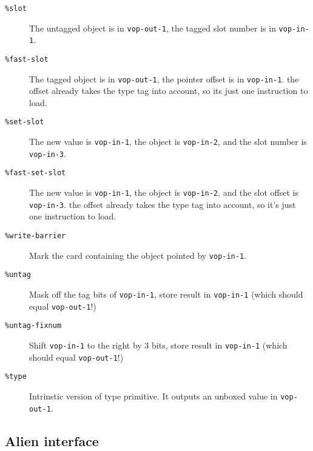 \documentclass{book}
\begin{document}
\begin{description}

\item[\texttt{\%slot}]  The untagged object is in \texttt{vop-out-1}, the tagged slot
  number is in \texttt{vop-in-1}.

\item[\texttt{\%fast-slot}] The tagged object is in \texttt{vop-out-1}, the pointer offset is
  in \texttt{vop-in-1}. the offset already takes the type tag into
  account, so its just one instruction to load.

\item[\texttt{\%set-slot}] The new value is \texttt{vop-in-1}, the object is \texttt{vop-in-2}, and
  the slot number is \texttt{vop-in-3}.

\item[\texttt{\%fast-set-slot}] The new value is \texttt{vop-in-1}, the object is \texttt{vop-in-2}, and
  the slot offset is \texttt{vop-in-3}.
  the offset already takes the type tag into account, so
  it's just one instruction to load.

\item[\texttt{\%write-barrier}] Mark the card containing the object pointed by \texttt{vop-in-1}.
  
\item[\texttt{\%untag}]  Mask off the tag bits of \texttt{vop-in-1}, store result in
  \texttt{vop-in-1} (which should equal \texttt{vop-out-1}!)

\item[\texttt{\%untag-fixnum}] Shift \texttt{vop-in-1} to the right by 3 bits, store result in
  \texttt{vop-in-1} (which should equal \texttt{vop-out-1}!)

\item[\texttt{\%type}]  Intrinstic version of type primitive. It outputs an
  unboxed value in \texttt{vop-out-1}.

\end{description}

\subsection{Alien interface}
\end{document}
